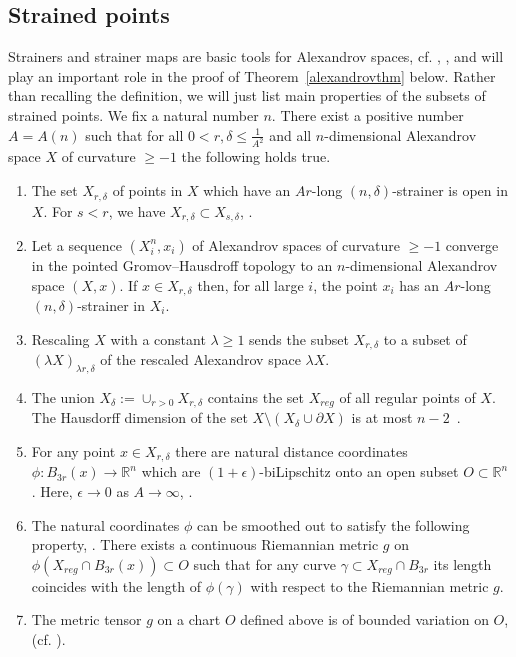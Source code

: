 \documentclass[12pt,leqno]{amsart}
\numberwithin{equation}{section}
\theoremstyle{definition}
\theoremstyle{remark}
\newcommand{\tref}[1]{Theorem~\ref{#1}}
\newcommand{\R}{\mathbb{R}}
\begin{document}
\subsection{Strained points}  \label{subsec:strainer}
  Strainers and strainer maps are basic tools for Alexandrov spaces, cf. \cite{BGP},  \cite{Otsu-Shioya}, \cite{Shioya} and will play an important role in the proof of \tref{alexandrovthm} below. Rather than recalling the definition, we will just list main properties of the subsets of strained points.  We fix a natural number $n$.
There exist a positive number $A=A(n)$ such that for   all $0<r,\delta \leq  \frac 1 {A^2}$ and all $n$-dimensional Alexandrov space $X$ of curvature $\geq -1$ the following holds true.
\begin{enumerate}

\item The set $X_{r,\delta}$ of points in $X$ which have an $Ar$-long $(n,\delta)$-strainer is   open in $X$.  For $s<r$, we have $X_{r,\delta} \subset X_{s,\delta}$,  \cite[9.7]{BGP}.

\item Let a sequence    $(X_i ^n,x_i)$ of Alexandrov spaces  of curvature $\geq -1$ converge in the pointed Gromov--Hausdroff topology to an $n$-dimensional Alexandrov space $(X,x)$.
If $x\in X_{r,\delta}$ then, for all large $i$, the point $x_i$ has an $Ar$-long  $(n, \delta)$-strainer in $X_i$.

 \item Rescaling $X$ with a constant $\lambda \geq 1$ sends the subset $X_{r,\delta}$ to a subset of $(\lambda X )_{\lambda r, \delta} $ of the rescaled Alexandrov space $\lambda X$.

\item The union $X_{\delta}:= \cup _{r>0}  X_{r,\delta}$ contains the set $X_{reg}$ of all regular points of $X$. The Hausdorff dimension of the set $X\setminus (X_{\delta} \cup \partial X)$ is at most $n-2$~\cite[10.6, 10.6.1, 12.8]{BGP}.

\item    For any point $x\in X_{r,\delta}$ there are natural distance coordinates $\phi: B_{3r} (x) \to \R^n$ which are $(1+\epsilon)$-biLipschitz onto an open subset $O \subset \R^n$.  Here, $\epsilon\to 0$ as $A\to\infty$, \cite[9.4]{BGP}.

\item The natural coordinates $\phi$ can be smoothed out to satisfy the following property, \cite[Theorem B]{Otsu-Shioya}.  There exists a continuous Riemannian metric  $g$ on $\phi (X_{reg} \cap B_{3r} (x)) \subset O$  such  that for any curve $\gamma \subset X_{reg} \cap B_{3r} $ its length
  coincides with  the length of $\phi (\gamma )$  with respect to the Riemannian metric $g$.

\item  The metric tensor $g$ on a chart $O$ defined above is of bounded variation on $O$, \cite[4.2]{Per-DC} (cf. \cite{AB15}).
    \end{enumerate}
\end{document}
